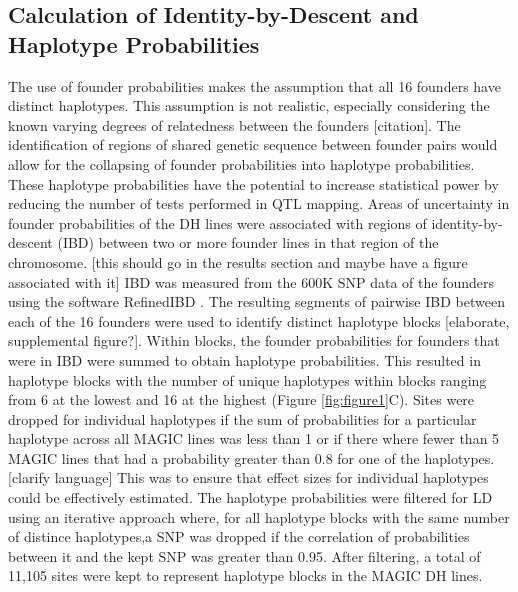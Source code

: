 \documentclass[article,9pt,twocolumn,twoside]{rilabRxiv}
\begin{document}
\subsection{Calculation of Identity-by-Descent and Haplotype Probabilities}
The use of founder probabilities makes the assumption that all 16 founders have distinct haplotypes.
This assumption is not realistic, especially considering the known varying degrees of relatedness between the founders [citation].
The identification of regions of shared genetic sequence between founder pairs would allow for the collapsing of founder probabilities into haplotype probabilities.
These haplotype probabilities have the potential to increase statistical power by reducing the number of tests performed in QTL mapping.
Areas of uncertainty in founder probabilities of the DH lines were associated with regions of identity-by-descent (IBD) between two or more founder lines in that region of the chromosome. [this should go in the results section and maybe have a figure associated with it]
IBD was measured from the 600K SNP data of the founders using the software RefinedIBD \citep{Browning459}.
The resulting segments of pairwise IBD between each of the 16 founders were used to identify distinct haplotype blocks [elaborate, supplemental figure?]. Within blocks, the founder probabilities for founders that were in  IBD were summed to obtain haplotype probabilities. This resulted in haplotype blocks with the number of unique haplotypes within blocks ranging from 6 at the lowest and 16 at the highest (Figure \ref{fig:figure1}C). Sites were dropped for individual haplotypes if the sum of probabilities for a particular haplotype across all MAGIC lines was less than 1 or if there where fewer than 5 MAGIC lines that had a probability greater than 0.8 for one of the haplotypes. [clarify language] This was to ensure that effect sizes for individual haplotypes could be effectively estimated. The haplotype probabilities were filtered for LD using an iterative approach where, for all haplotype blocks with the same number of distince haplotypes,a SNP was dropped if the correlation of probabilities between it and the kept SNP was greater than 0.95. After filtering, a total of 11,105 sites were kept to represent haplotype blocks in the MAGIC DH lines.
\end{document}
